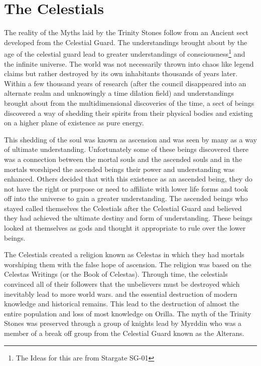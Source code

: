 \section{The Celestials}

The reality of the Myths laid by the Trinity Stones follow from an Ancient sect developed from the Celestial Guard. The understandings brought about by the age of the celestial guard lead to greater understandings of consciousness\footnote{The Ideas for this are from Stargate SG-01} and the infinite universe. The world was not necessarily thrown into chaos like legend claims but rather destroyed by its own inhabitants thousands of years later. Within a few thousand years of research (after the council disappeared into an alternate realm and unknowingly a time dilation field) and understandings brought about from the multidimensional discoveries of the time, a sect of beings discovered a way of shedding their spirits from their physical bodies and existing on a higher plane of existence as pure energy. 

This shedding of the soul was known as ascension and was seen by many as a way of ultimate understanding. Unfortunately some of these beings discovered there was a connection between the mortal souls and the ascended souls and in the mortals worshiped the ascended beings their power and understanding was enhanced. Others decided that with this existence as an ascended being, they do not have the right or purpose or need to affiliate with lower life forms and took off into the universe to gain a greater understanding. The ascended beings who stayed called themselves the Celestials after the Celestial Guard and believed they had achieved the ultimate destiny and form of understanding. These beings looked at themselves as gods and thought it appropriate to rule over the lower beings.

The Celestials created a religion known as Celestas in which they had mortals worshiping them with the false hope of ascension. The religion was based on the Celestas Writings (or the Book of Celestas). Through time, the celestials convinced all of their followers that the unbelievers must be destroyed which inevitably lead to more world wars.  and the essential destruction of modern knowledge and historical remains. This lead to the destruction of almost the entire population and loss of most knowledge on Orilla. The myth of the Trinity Stones was preserved through a group of knights lead by Myrddin who was a member of a break off group from the Celestial Guard known as the Alterans. 

